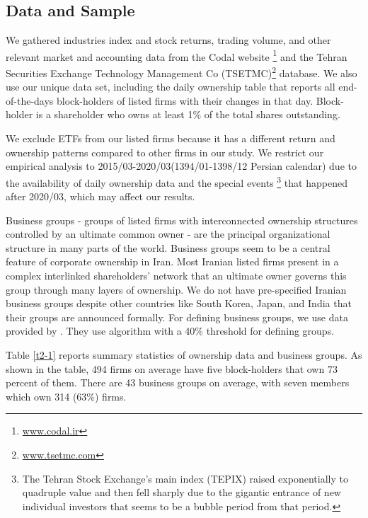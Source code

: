 \documentclass[12pt, a4paper]{article}
\begin{document}
\subsection{Data and Sample}


We gathered industries index and stock returns, trading volume, and other relevant market and accounting data from the Codal website \footnote{\href{http://www.codal.ir}{www.codal.ir}}
 and the  Tehran Securities Exchange Technology Management Co (TSETMC)\footnote{\href{http://www.tsetmc.com}{www.tsetmc.com}} database.
We also use our unique data set, including the daily ownership table that reports all end-of-the-days block-holders of listed firms with their changes in that day.  Block-holder is a shareholder who owns at least 1\% of the total shares outstanding. 

  We exclude ETFs from our listed firms because it has a different return and ownership patterns compared to other firms in our study.
We restrict our empirical analysis to 2015/03-2020/03(1394/01-1398/12 Persian calendar) due to the availability of daily ownership data and the special events \footnote{
The Tehran Stock Exchange's main index (TEPIX) raised exponentially to quadruple value and then fell sharply due to the gigantic entrance of new individual investors that seems to be a bubble period from that period.} that happened after 2020/03, which may affect our results. 
  
  
  
  Business groups - groups of listed firms with interconnected ownership structures controlled by an ultimate common owner - are the principal organizational structure in many parts of the world.
  Business groups seem to be a central feature of corporate ownership in Iran. 
  Most Iranian listed firms present in a complex interlinked shareholders' network that an ultimate owner governs this group through many layers of ownership.{\cite{Aliabadi2022}}  
We do not have pre-specified Iranian business groups despite other countries like South Korea, Japan, and India that their groups are announced formally.
For defining business groups, we use data provided by {\cite{Aliabadi2022}}.
They use \cite{almeida2011structure} algorithm with a 40\% threshold for defining groups. 


Table \ref{t2-1} reports summary statistics of ownership data and business groups. As shown in the table, 494 firms on average have five block-holders that own 73 percent of them. There are 43 business groups on average, with seven members which own 314 (63\%) firms. 
\normalcolor
\end{document}
